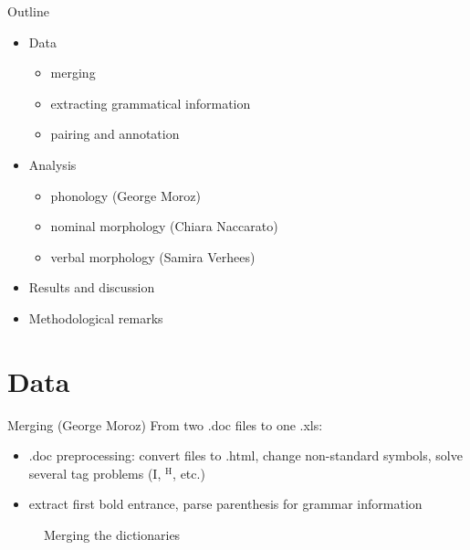 \begin{frame}{Outline}
\begin{itemize}
    \item Data 
    \begin{itemize}
        \item merging
        \item extracting grammatical information
        \item pairing and annotation
    \end{itemize}
    \item Analysis
    \begin{itemize}
        \item phonology (George Moroz)
        \item nominal morphology (Chiara Naccarato)
        \item verbal morphology (Samira Verhees)
    \end{itemize}
    \item Results and discussion
    \item Methodological remarks 
\end{itemize}
\end{frame}

\section{Data}
\begin{frame}{Merging (George Moroz)}
From two .doc files to one .xls:

\begin{itemize}
    \item .doc preprocessing: convert files to .html, change non-standard symbols, solve several tag problems (I, $^\text{H}$, etc.)
    \item extract first bold entrance, parse parenthesis for grammar information
\end{itemize}

\begin{figure}[h]
\centering
{}
\caption{Merging the dictionaries}
\end{figure}
\end{frame}

